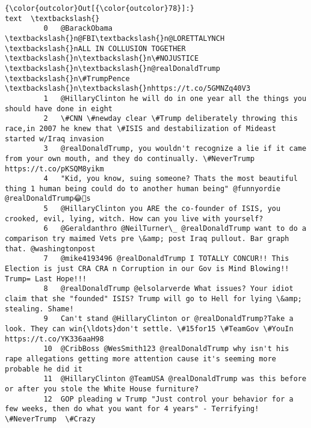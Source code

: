 \documentclass[11pt]{article}
\begin{document}
\begin{Verbatim}[commandchars=\\\{\}]
{\color{outcolor}Out[{\color{outcolor}78}]:}                                                                                                                                                         text  \textbackslash{}
         0   @BarackObama \textbackslash{}n@FBI\textbackslash{}n@LORETTALYNCH \textbackslash{}nALL IN COLLUSION TOGETHER \textbackslash{}n\textbackslash{}n\#NOJUSTICE \textbackslash{}n\textbackslash{}n@realDonaldTrump \textbackslash{}n\#TrumpPence \textbackslash{}n\textbackslash{}nhttps://t.co/5GMNZq40V3               
         1   @HillaryClinton he will do in one year all the things you should have done in eight                                                                        
         2   \#CNN \#newday clear \#Trump deliberately throwing this race,in 2007 he knew that \#ISIS and destabilization of Mideast started w/Iraq invasion                
         3   @realDonaldTrump, you wouldn't recognize a lie if it came from your own mouth, and they do continually. \#NeverTrump https://t.co/pKSQM8yikm                
         4   "Kid, you know, suing someone? Thats the most beautiful thing 1 human being could do to another human being" @funnyordie @realDonaldTrump😂💩s               
         5   @HillaryClinton you ARE the co-founder of ISIS, you crooked, evil, lying, witch. How can you live with yourself?                                           
         6   @Geraldanthro @NeilTurner\_ @realDonaldTrump want to do a comparison try maimed Vets pre \&amp; post Iraq pullout. Bar graph that. @washingtonpost           
         7   @mike4193496 @realDonaldTrump I TOTALLY CONCUR!! This Election is just CRA CRA n Corruption in our Gov is Mind Blowing!! Trump= Last Hope!!!               
         8   @realDonaldTrump @elsolarverde What issues? Your idiot claim that she "founded" ISIS? Trump will go to Hell for lying \&amp; stealing. Shame!               
         9   Can't stand @HillaryClinton or @realDonaldTrump?Take a look. They can win{\ldots}don't settle. \#15for15 \#TeamGov \#YouIn  https://t.co/YK336aaH98                
         10  @CribBoss @WesSmith123 @realDonaldTrump why isn't his rape allegations getting more attention cause it's seeming more probable he did it                   
         11  @HillaryClinton @TeamUSA @realDonaldTrump was this before or after you stole the White House furniture?                                                    
         12  GOP pleading w Trump "Just control your behavior for a few weeks, then do what you want for 4 years" - Terrifying! \#NeverTrump  \#Crazy                     

\end{Verbatim}
\end{document}
